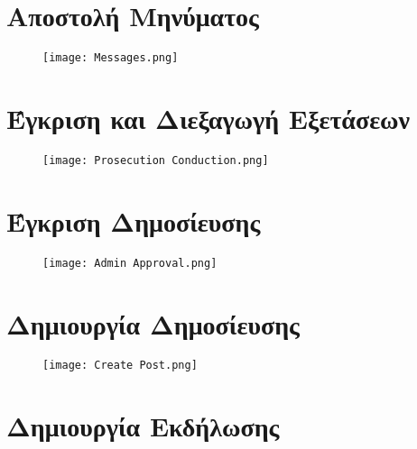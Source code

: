 \documentclass{article}
\begin{document}
\section{Αποστολή Μηνύματος}

\vspace{0.2cm}

\begin{figure}[!htb]
        \centering
        \texttt{[image: Messages.png]}
\end{figure}

\newpage

\section{Έγκριση και Διεξαγωγή Εξετάσεων}

\vspace{0.2cm}

\begin{figure}[!htb]
        \centering
        \texttt{[image: Prosecution Conduction.png]}
\end{figure}

\newpage

\section{Έγκριση Δημοσίευσης}

\vspace{0.2cm}

\begin{figure}[!htb]
        \centering
        \texttt{[image: Admin Approval.png]}
\end{figure}

\newpage

\section{Δημιουργία Δημοσίευσης}

\vspace{0.2cm}

\begin{figure}[!htb]
        \centering
        \texttt{[image: Create Post.png]}
\end{figure}

\newpage

\section{Δημιουργία Εκδήλωσης}
\end{document}
